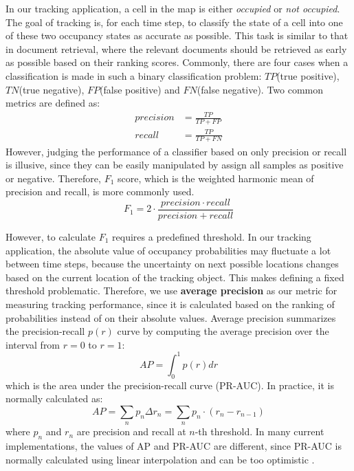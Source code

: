 In our tracking application, a cell in the map is either \textit{occupied} or \textit{not occupied}. The goal of tracking is, for each time step, to classify the state of a cell into one of these two occupancy states as accurate as possible. This task is similar to that in document retrieval, where the relevant documents should be retrieved as early as possible based on their ranking scores. Commonly, there are four cases when a classification is made in such a binary classification problem: $TP$(true positive), $TN$(true negative), $FP$(false positive) and $FN$(false negative). Two common metrics are defined as:
\begin{align}
precision &= \frac{TP}{TP+FP} \\
recall &= \frac{TP}{TP+FN}
\end{align} 
However, judging the performance of a classifier based on  only precision or recall is illusive, since they can be easily manipulated by assign all samples as positive or negative. Therefore, $F_1$ score, which is the weighted harmonic mean of precision and recall, is more commonly used.
\begin{equation}
F_1 = 2\cdot\frac{ precision \cdot recall}{precision+recall}
\end{equation}

However, to calculate $F_1$ requires a predefined threshold. In our tracking application, the absolute value of occupancy probabilities may fluctuate a lot between time steps, because the uncertainty on next possible locations changes based on the current location of the tracking object. This makes defining a fixed threshold problematic. Therefore, we use \textbf{average precision} as our metric for measuring tracking performance, since it is calculated based on the ranking of probabilities instead of on their absolute values. Average precision summarizes the precision-recall $p(r)$ curve by computing the average precision over the interval from $r=0$ to $r=1$:
\begin{equation}
AP = \int_0^1 p(r) dr
\end{equation}
which is the area under the precision-recall curve (PR-AUC). In practice, it is normally calculated as:
\begin{equation}
AP = \sum_n p_n\Delta r_n =\sum_n p_n \cdot (r_{n}-r_{n-1})
\end{equation} 
where $p_n$ and $r_n$ are precision and recall at $n$-th threshold. In many current implementations, the values of AP and PR-AUC are different, since PR-AUC is normally calculated using linear interpolation and can be too optimistic \cite{flach2015precision}.   

